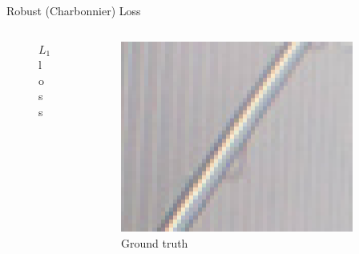\documentclass{beamer}
\begin{document}
\begin{frame}{Robust (Charbonnier) Loss}
\begin{columns}
\begin{column}{0.33\linewidth}
\begin{figure}[h]
      \caption*{$L_1$ loss}
    \end{figure}
  \end{column}  \begin{column}{0.33\linewidth}
    \begin{figure}[h]
      \centering
        \includegraphics[width=0.9\textwidth]{loss_functions_lap_gt}
      \caption*{Ground truth}
    \end{figure}
  \end{column}
\end{columns}
\end{frame}
\end{document}
